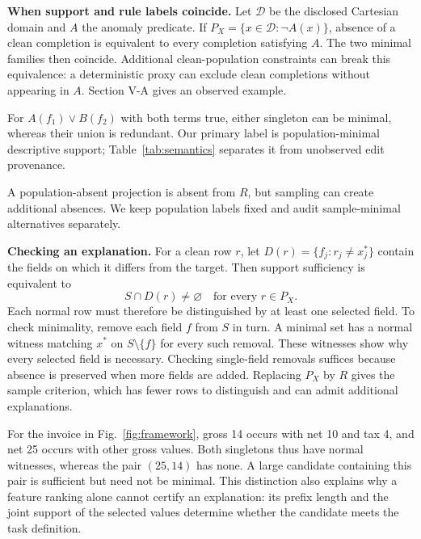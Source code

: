 \documentclass[conference]{IEEEtran}
\begin{document}
\textbf{When support and rule labels coincide.} Let $\mathcal D$ be the disclosed Cartesian domain and $A$ the anomaly predicate. If $P_X=\{x\in\mathcal D:\neg A(x)\}$, absence of a clean completion is equivalent to every completion satisfying $A$. The two minimal families then coincide. Additional clean-population constraints can break this equivalence: a deterministic proxy can exclude clean completions without appearing in $A$. Section V-A gives an observed example.

For $A(f_1)\lor B(f_2)$ with both terms true, either singleton can be minimal, whereas their union is redundant. Our primary label is population-minimal descriptive support; Table~\ref{tab:semantics} separates it from unobserved edit provenance.

A population-absent projection is absent from $R$, but sampling can create additional absences. We keep population labels fixed and audit sample-minimal alternatives separately.

\textbf{Checking an explanation.} For a clean row $r$, let $D(r)=\{f_j:r_j\ne x^*_j\}$ contain the fields on which it differs from the target. Then support sufficiency is equivalent to
\[
  S\cap D(r)\ne\varnothing\quad\text{for every }r\in P_X.
\]
Each normal row must therefore be distinguished by at least one selected field. To check minimality, remove each field $f$ from $S$ in turn. A minimal set has a normal witness matching $x^*$ on $S\setminus\{f\}$ for every such removal. These witnesses show why every selected field is necessary. Checking single-field removals suffices because absence is preserved when more fields are added. Replacing $P_X$ by $R$ gives the sample criterion, which has fewer rows to distinguish and can admit additional explanations.

For the invoice in Fig.~\ref{fig:framework}, gross 14 occurs with net 10 and tax 4, and net 25 occurs with other gross values. Both singletons thus have normal witnesses, whereas the pair $(25,14)$ has none. A large candidate containing this pair is sufficient but need not be minimal. This distinction also explains why a feature ranking alone cannot certify an explanation: its prefix length and the joint support of the selected values determine whether the candidate meets the task definition.
\end{document}
